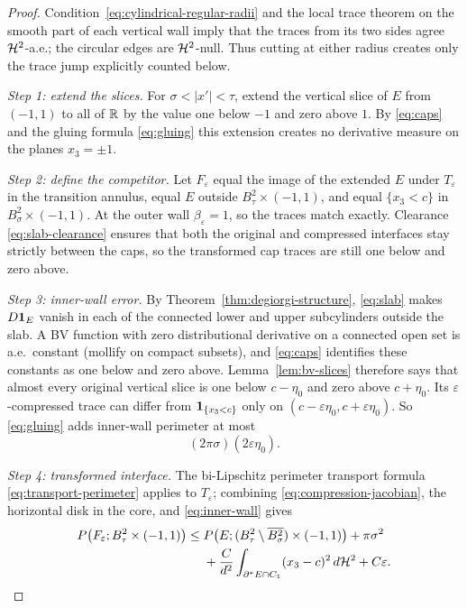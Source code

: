 \begin{proof}
Condition~\eqref{eq:cylindrical-regular-radii} and the local trace theorem on
the smooth part of each vertical wall imply that the traces from its two
sides agree $\mathcal H^2$-a.e.; the circular edges are $\mathcal H^2$-null.  Thus cutting
at either radius creates only the trace jump explicitly counted below.

\emph{Step 1: extend the slices.}  For $\sigma<|x'|<\tau$, extend the vertical
slice of $E$ from $(-1,1)$ to all of $\mathbb R$ by the value one below $-1$ and zero
above $1$.  By \eqref{eq:caps} and the gluing formula \eqref{eq:gluing} this
extension creates no derivative measure on the planes $x_3=\pm1$.

\emph{Step 2: define the competitor.}  Let $F_\varepsilon$ equal the image of
the extended $E$ under $T_\varepsilon$ in the transition annulus, equal $E$
outside $B_\tau^2\times(-1,1)$, and equal $\{x_3<c\}$ in
$B_\sigma^2\times(-1,1)$.  At the outer wall
$\beta_\varepsilon=1$, so the traces match exactly.  Clearance
\eqref{eq:slab-clearance} ensures that both the original and compressed
interfaces stay strictly between the caps, so the transformed cap traces are
still one below and zero above.

\emph{Step 3: inner-wall error.}  By Theorem~\ref{thm:degiorgi-structure},
\eqref{eq:slab} makes $D\mathbf 1_{E}$ vanish in each of the connected lower and
upper subcylinders outside the slab.  A BV function with zero distributional
derivative on a connected open set is a.e.\ constant (mollify on compact
subsets), and \eqref{eq:caps} identifies these constants as one below and
zero above.  Lemma~\ref{lem:bv-slices} therefore says that almost every
original vertical slice is one below $c-\eta_0$ and zero above
$c+\eta_0$.  Its $\varepsilon$-compressed trace can differ from
$\mathbf 1_{\{x_3<c\}}$ only on $(c-\varepsilon\eta_0,c+\varepsilon\eta_0)$.  So
\eqref{eq:gluing} adds inner-wall perimeter at most
\begin{equation}\label{eq:inner-wall}
  (2\pi\sigma)(2\varepsilon\eta_0).
\end{equation}

\emph{Step 4: transformed interface.}  The bi-Lipschitz perimeter transport
formula \eqref{eq:transport-perimeter} applies to $T_\varepsilon$; combining
\eqref{eq:compression-jacobian}, the horizontal disk in the core, and
\eqref{eq:inner-wall} gives
\begin{equation}\label{eq:deformation-eps}
\begin{aligned}
  P\bigl(F_\varepsilon;B_\tau^2\times(-1,1)\bigr)
  \le{}&P\bigl(E;(B_\tau^2\setminus\overline{B_\sigma^2})\times(-1,1)\bigr)
       +\pi\sigma^2\\
  &+\frac C{d^2}\int_{\partial^* E\cap C_1}(x_3-c)^2\,d\mathcal H^2+C\varepsilon .
\end{aligned}
\end{equation}


\end{proof}
